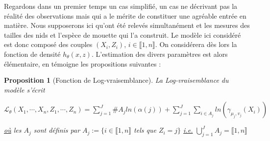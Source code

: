 \documentclass[frenchb]{report}
\newcommand{\1}{\mathbbm{1}}
\newtheorem{prop}{Proposition}
\theoremstyle{definition}\newtheorem{defn}{Définition}
\theoremstyle{definition}\newtheorem{exm}{Exemple}
\theoremstyle{definition}\newtheorem{nota}{Notation}
\theoremstyle{definition}\newtheorem{rem}{Remarque}
\begin{document}
Regardons dans un premier temps un cas simplifié, un cas ne décrivant pas la réalité des observations mais qui a le mérite de constituer une agréable entrée en matière. \newline
Nous supposerons ici qu'ont été relevés simultanément et les mesures des tailles des nids et l'espèce de mouette qui l'a construit. Le modèle ici considéré est donc composé des couples $(X_i, Z_i)$, $i \in \llbracket1,n \rrbracket$. On considérera dès lors la fonction de densité $h_\theta(x,z)$.\newline
L'estimation des divers paramètres est alors élémentaire, en témoigne les propositions suivantes :
\begin{prop}[Fonction de Log-vraisemblance]
La Log-vraisemblance du modèle s'écrit
\begin{center} $\mathcal{L}_\theta(X_1, \cdots, X_n, Z_1, \cdots, Z_n) = \displaystyle \sum_{j=1}^J \#A_j ln(\alpha(j)) + \sum_{j=1}^J\sum_{i\in A_j}ln(\gamma_{\mu_j, v_j}(X_i))$ \end{center}
\underline{où} les $A_j$ sont définis par $A_j := \{ i\in \llbracket1,n \rrbracket$ tels que $Z_i = j \}$ \underline{i.e.} $\displaystyle\bigcup_{j=1}^J A_j = \llbracket1,n \rrbracket$
\end{prop}
\end{document}
